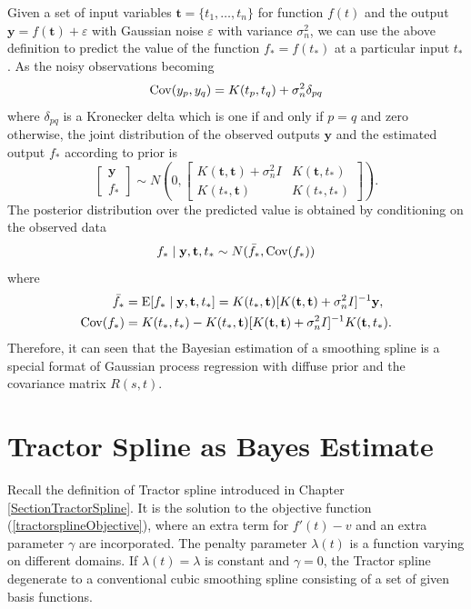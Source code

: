 Given a set of input variables $\mathbf{t} = \{t_1,\ldots,t_n\}$ for function $f(t)$ and the output $\mathbf{y}=f(\mathbf{t})+\varepsilon$ with \iid  Gaussian noise $\varepsilon$ with variance $\sigma_n^2$,  we can use the above definition to predict the value of the function $f_*=f(t_*)$ at a particular input $t_*$. As the noisy observations becoming
\begin{equation*} %
\Cov (y_p,y_q) = K(t_p,t_q)+\sigma_n^2 \delta_{pq}
\end{equation*}
where $\delta_{pq}$ is a Kronecker delta which is one if and only if $p=q$ and zero otherwise, the joint distribution of the observed outputs $\mathbf{y}$ and the estimated output $f_*$ according to prior is
\begin{equation}
\begin{bmatrix}
\mathbf{y}\\
f_*
\end{bmatrix} \sim N \left(  
0,  \begin{bmatrix}
K(\mathbf{t},\mathbf{t}) +\sigma_n^2I& K(\mathbf{t},t_*) \\
K(t_*,\mathbf{t}) & K(t_*,t_*)
\end{bmatrix} 
\right).
\end{equation}
The posterior distribution over the predicted value is obtained by conditioning on the observed data
\begin{equation*}
f_* \mid  \mathbf{y},\mathbf{t},t_* \sim N(\bar{f_*},\mathrm{Cov} (f_*))
\end{equation*}
where 
\begin{align}
\bar{f_*}&=\mathrm{E} [f_* \mid  \mathbf{y},\mathbf{t},t_* ]=K(t_*,\mathbf{t})[K(\mathbf{t},\mathbf{t})+\sigma_n^2I]^{-1}\mathbf{y},\\
\mathrm{Cov}(f_*)&=K(t_*,t_*)-K(t_*,\mathbf{t})[K(\mathbf{t},\mathbf{t})+\sigma_n^2I]^{-1}K(\mathbf{t},t_*).
\end{align}
Therefore, it can seen that the Bayesian estimation of a smoothing spline is a special format of Gaussian process regression with diffuse prior and the covariance matrix $R(s,t)$. 





\section{Tractor Spline as Bayes Estimate}


Recall the definition of Tractor spline introduced in Chapter \ref{SectionTractorSpline}. It is the solution to the objective function (\ref{tractorsplineObjective}), where an extra term for $f'(t)-v$ and an extra parameter $\gamma$ are incorporated. The penalty parameter $\lambda(t)$ is a function varying on different domains. If $\lambda(t)=\lambda$ is constant and $\gamma=0$, the Tractor spline degenerate to a conventional cubic smoothing spline consisting of a set of given basis functions.  

